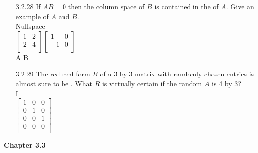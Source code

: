 \documentclass[10pt,twoside,reqno]{article}
\begin{document}
\begin{enumerate}
\vspace{3mm}
\item[3.2.28] If $AB = 0$ then the column space of $B$ is contained in the \underline{\hspace{8mm}} of $A$. Give an example of $A$ and $B$. \\
\vspace{3mm}
Nullspace\\
$
$$
\begin{bmatrix}
1&2\\
2&4\\
\end{bmatrix}
\begin{bmatrix}
1&0\\
-1&0\\
\end{bmatrix}
$$
$\\
\hspace{4mm}A \hspace{8mm} B \\

\vspace{20mm}
\item[3.2.29] The reduced form $R$ of a 3 by 3 matrix with randomly chosen entries is almost sure to be \underline{\hspace{8mm}}. What $R$ is virtually certain if the random $A$ is 4 by 3? \\
\vspace{3mm}
I\\
\vspace{3mm}
$
$$
\begin{bmatrix}
1&0&0\\
0&1&0\\
0&0&1\\
0&0&0\\
\end{bmatrix}
$$
$

\end{enumerate}
\vspace{5mm}
\textbf{Chapter 3.3}
\end{document}
